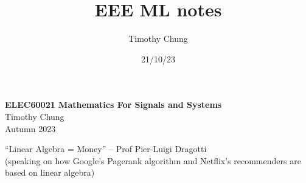 \documentclass{report}
\title{EEE ML notes}
\author{Timothy Chung}
\date{21/10/23}
\begin{document}
% 
\begin{titlepage}
    \centering
    \vspace*{1cm}
    \Huge
    \textbf{ELEC60021 Mathematics For Signals and Systems} \\
    \vspace{1cm}
    \Large
    Timothy Chung \\
    \vspace{1cm}
    Autumn 2023 \\
    \vfill
\end{titlepage}

\tableofcontents
\newpage

{\Large ``Linear Algebra = Money'' – Prof Pier-Luigi Dragotti }\\

(speaking on how Google's Pagerank algorithm and Netflix's recommenders are based on linear algebra)




\end{document}
